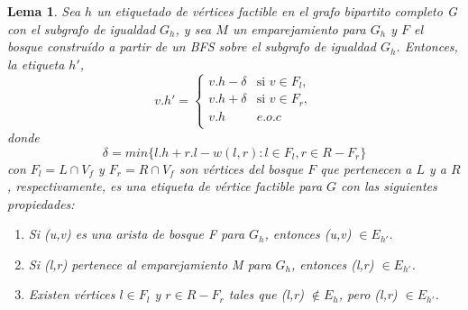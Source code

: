 \documentclass[10pt]{article} %
\newtheorem{lem}{Lema}
\begin{document}
	\begin{lem}
		\cite{introduction}
		Sea $h$ un etiquetado de v\'ertices factible en el grafo bipartito completo G con el subgrafo de igualdad $G_h$, y sea $M$ un emparejamiento para $G_h$ y $F$ el bosque constru\'ido a partir de un BFS sobre el subgrafo de igualdad $G_h$. Entonces, la etiqueta $h'$,
		\begin{equation}
			v.h' =  \left\{
			\begin{array}{ll}
				v.h-\delta & \text{si $v \in F_l$}, \\
				v.h+\delta & \text{si $v \in F_r$}, \\
				v.h & e.o.c \\
			\end{array} 
			\right.
		\end{equation}				
		donde 
		\begin{equation}
			\label{eqn:delta}
			\delta = min\{l.h + r.l - w(l,r): l\in F_l, r \in R-F_r\}
		\end{equation}
		con $F_l = L \cap V_f$ y $F_r = R \cap V_f$ son v\'ertices del bosque $F$ que pertenecen a $L$ y a $R$, respectivamente, es una etiqueta de v\'ertice factible para $G$ con las siguientes propiedades:
		\begin{enumerate}
			\item Si (u,v) es una arista de bosque F para $G_h$, entonces (u,v) $\in E_{h'}$.
			\item Si (l,r) pertenece al emparejamiento M para $G_h$, entonces (l,r) $\in E_{h'}$.
			\item Existen v\'ertices $l \in F_l$ y $r \in R - F_r$ tales que (l,r) $\notin E_h$, pero (l,r) $\in E_{h'}$.  
		\end{enumerate} 
	\end{lem}
\end{document}
